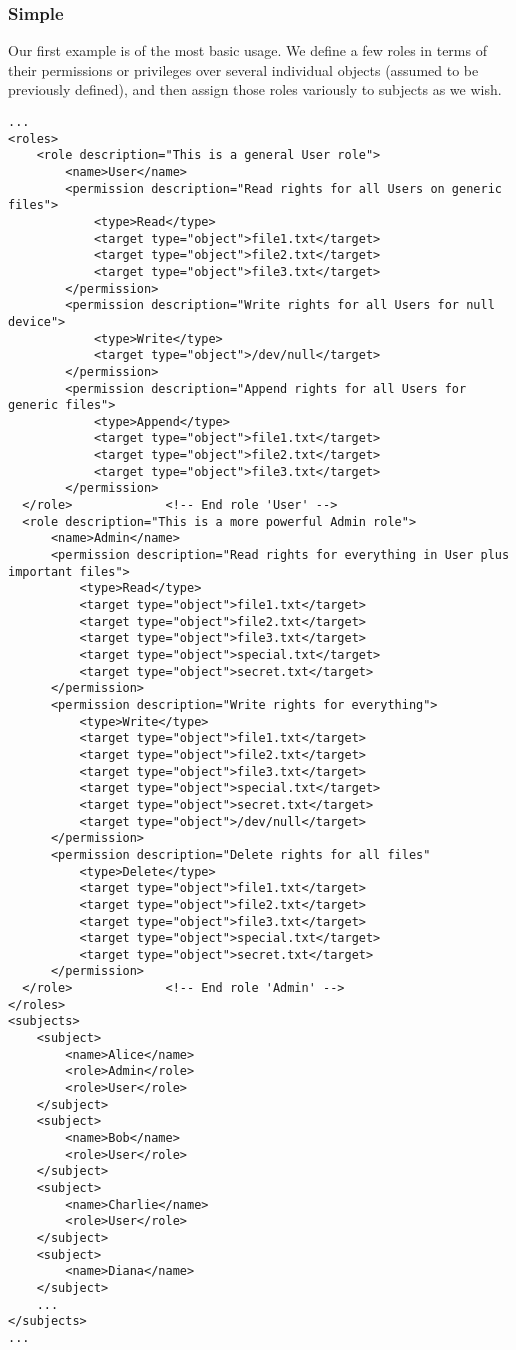 \documentclass{article}
\begin{document}
\subsubsection{Simple}
Our first example is of the most basic usage. We define a few roles in terms of their permissions or privileges over several individual objects (assumed to be previously defined), and then assign those roles variously to subjects as we wish.
\begin{lstlisting}
...
<roles>
    <role description="This is a general User role">
        <name>User</name>
        <permission description="Read rights for all Users on generic files">
            <type>Read</type>
            <target type="object">file1.txt</target>
            <target type="object">file2.txt</target>
            <target type="object">file3.txt</target>
        </permission>
        <permission description="Write rights for all Users for null device">
            <type>Write</type>
            <target type="object">/dev/null</target>
        </permission>
        <permission description="Append rights for all Users for generic files">
            <type>Append</type>
            <target type="object">file1.txt</target>
            <target type="object">file2.txt</target>
            <target type="object">file3.txt</target>
        </permission>
  </role>             <!-- End role 'User' -->
  <role description="This is a more powerful Admin role">
      <name>Admin</name>
      <permission description="Read rights for everything in User plus important files">
          <type>Read</type>
          <target type="object">file1.txt</target>
          <target type="object">file2.txt</target>
          <target type="object">file3.txt</target>
          <target type="object">special.txt</target>
          <target type="object">secret.txt</target>
      </permission>
      <permission description="Write rights for everything">
          <type>Write</type>
          <target type="object">file1.txt</target>
          <target type="object">file2.txt</target>
          <target type="object">file3.txt</target>
          <target type="object">special.txt</target>
          <target type="object">secret.txt</target>
          <target type="object">/dev/null</target>
      </permission>
      <permission description="Delete rights for all files"
          <type>Delete</type>
          <target type="object">file1.txt</target>
          <target type="object">file2.txt</target>
          <target type="object">file3.txt</target>
          <target type="object">special.txt</target>
          <target type="object">secret.txt</target>
      </permission>
  </role>             <!-- End role 'Admin' -->
</roles>
<subjects>
    <subject>
        <name>Alice</name>
        <role>Admin</role>
        <role>User</role>
    </subject>
    <subject>
        <name>Bob</name>
        <role>User</role>
    </subject>
    <subject>
        <name>Charlie</name>
        <role>User</role>
    </subject>
    <subject>
        <name>Diana</name>
    </subject>
    ...
</subjects>
...
\end{lstlisting}
\end{document}
